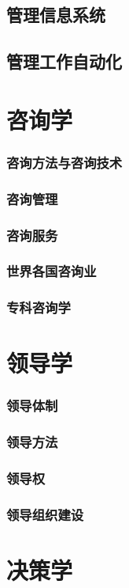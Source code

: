 \documentclass[UTF8]{../RepresentationUniverse}
\begin{document}
    \subsection{管理信息系统}
    \subsection{管理工作自动化}
\section{咨询学}
    \subsubsection{咨询方法与咨询技术}
    \subsubsection{咨询管理}
    \subsubsection{咨询服务}
    \subsubsection{世界各国咨询业}
    \subsubsection{专科咨询学}
\section{领导学}
    \subsubsection{领导体制}
    \subsubsection{领导方法}
    \subsubsection{领导权}
    \subsubsection{领导组织建设}
\section{决策学}
\end{document}
